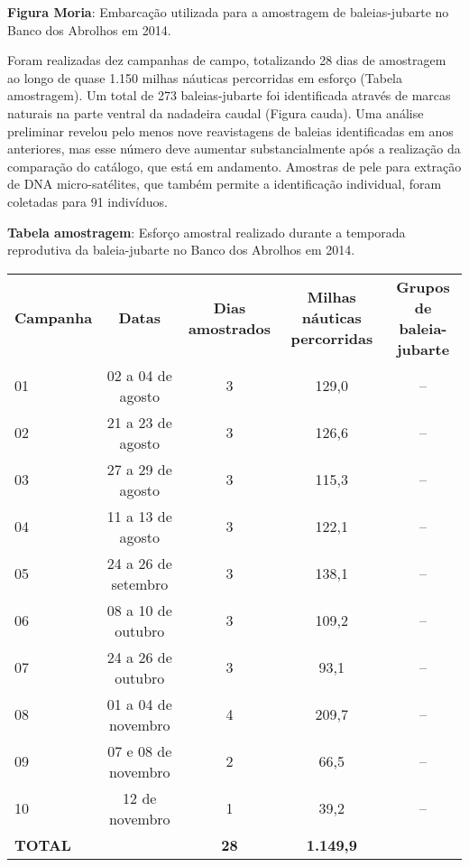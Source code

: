 \textbf{Figura Moria}: Embarcação utilizada para a amostragem de baleias-jubarte no Banco dos Abrolhos em 2014.

Foram realizadas dez campanhas de campo, totalizando 28 dias de amostragem ao longo de quase 1.150 milhas náuticas percorridas em esforço (Tabela amostragem). Um total de 273 baleias-jubarte foi identificada através de marcas naturais na parte ventral da nadadeira caudal (Figura cauda). Uma análise preliminar revelou pelo menos nove reavistagens de baleias identificadas em anos anteriores, mas esse número deve aumentar substancialmente após a realização da comparação do catálogo, que está em andamento. Amostras de pele para extração de DNA micro-satélites, que também permite a identificação individual, foram coletadas para 91 indivíduos.

\textbf{Tabela amostragem}: Esforço amostral realizado durante a temporada reprodutiva da baleia-jubarte no Banco dos Abrolhos em 2014.  
\begin{tabular}{lcccc}  
\textbf{Campanha} & \textbf{Datas} & \textbf{Dias amostrados} & \textbf{Milhas náuticas percorridas} & \textbf{Grupos de baleia-jubarte} \\
01 & 02 a 04 de agosto & 3 & 129,0 & -- \\
02 & 21 a 23 de agosto & 3 & 126,6 & -- \\
03 & 27 a 29 de agosto & 3 & 115,3 & -- \\
04 & 11 a 13 de agosto & 3 & 122,1 & -- \\
05 & 24 a 26 de setembro & 3 & 138,1 & -- \\
06 & 08 a 10 de outubro & 3 & 109,2 & -- \\
07 & 24 a 26 de outubro & 3 & 93,1 & -- \\
08 & 01 a 04 de novembro & 4 & 209,7 & -- \\
09 & 07 e 08 de novembro & 2 & 66,5 & -- \\
10 & 12 de novembro & 1 & 39,2 & -- \\
\textbf{TOTAL} & & \textbf{28} & \textbf{1.149,9} & \\
\end{tabular}    

